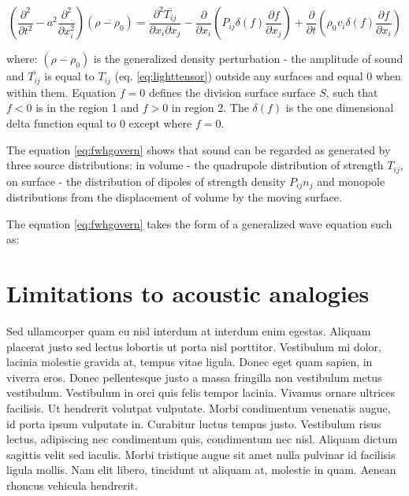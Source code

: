\begin{equation} \label{eq:fwhgovern}
\left( \frac{\partial^2}{\partial t^2} - a^2 \frac{\partial^2}{\partial x_i^2} \right)
\left( \overline{\rho - \rho_0} \right)
=
\frac{\partial^2 \overline{T_{ij}}}{\partial x_i \partial x_j}
- \frac{\partial}{\partial x_i} \left( P_{ij} \delta(f) \frac{\partial f}{\partial x_j} \right)
+ \frac{\partial}{\partial t} \left( \rho_0 v_i \delta(f) \frac{\partial f}{\partial x_i} \right)
\end{equation}

\noindent where: $\left( \overline{\rho - \rho_0} \right)$ is the generalized density perturbation - the amplitude of sound and $\overline{T_{ij}}$ is equal to $T_{ij}$ (eq. \ref{eq:lighttensor}) outside any surfaces and equal 0 when within them. Equation $f=0$ defines the division surface surface $S$, such that $f<0$ is in the region 1 and $f>0$ in region 2. The $\delta(f)$ is the one dimensional delta function equal to 0 except where $f=0$. 

The equation \ref{eq:fwhgovern} shows that sound can be regarded as generated by three source distributions: in volume - the quadrupole distribution of strength $T_{ij}$, on surface - the distribution of dipoles of strength density $P_{ij}n_j$ and monopole distributions from the displacement of volume by the moving surface.

The equation \ref{eq:fwhgovern} takes the form of a generalized wave equation such as:

\section{Limitations to acoustic analogies}
Sed ullamcorper quam eu nisl interdum at interdum enim egestas. Aliquam placerat justo sed lectus lobortis ut porta nisl porttitor. Vestibulum mi dolor, lacinia molestie gravida at, tempus vitae ligula. Donec eget quam sapien, in viverra eros. Donec pellentesque justo a massa fringilla non vestibulum metus vestibulum. Vestibulum in orci quis felis tempor lacinia. Vivamus ornare ultrices facilisis. Ut hendrerit volutpat vulputate. Morbi condimentum venenatis augue, id porta ipsum vulputate in. Curabitur luctus tempus justo. Vestibulum risus lectus, adipiscing nec condimentum quis, condimentum nec nisl. Aliquam dictum sagittis velit sed iaculis. Morbi tristique augue sit amet nulla pulvinar id facilisis ligula mollis. Nam elit libero, tincidunt ut aliquam at, molestie in quam. Aenean rhoncus vehicula hendrerit.